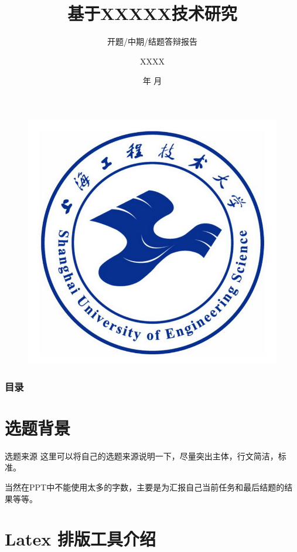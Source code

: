 \documentclass{beamer}
\author{XXXX}
\title{基于XXXXX技术研究}
\subtitle{开题/中期/结题答辩报告}
\institute{上海工程技术大学电子电气工程学院}
\date{\number\year 年 \number\month 月}
\begin{document}
\kaishu
\begin{frame}
    \titlepage
    \begin{figure}[htpb]
        \begin{center}
            \includegraphics[width=0.2\linewidth]{sues-logo.jpg}
        \end{center}
    \end{figure}
\end{frame}

\begin{frame}
    \frametitle{目录}
    \tableofcontents[sectionstyle=show,subsectionstyle=show/shaded/hide,subsubsectionstyle=show/shaded/hide]
\end{frame}


\section{选题背景}
\begin{frame}{选题来源}
    这里可以将自己的选题来源说明一下，尽量突出主体，行文简洁，标准。
    
    当然在PPT中不能使用太多的字数，主要是为汇报自己当前任务和最后结题的结果等等。
\end{frame}

\section{Latex 排版工具介绍}
\end{document}
